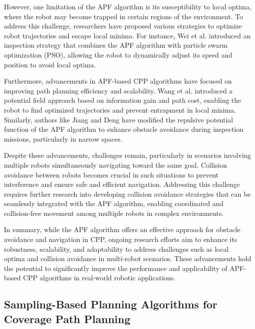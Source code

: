 \vspace*{6mm}

However, one limitation of the APF algorithm is its susceptibility to local optima, where the robot may become trapped in certain regions of the environment. To address this challenge, researchers have proposed various strategies to optimize robot trajectories and escape local minima. For instance, Wei et al. introduced an inspection strategy that combines the APF algorithm with particle swarm optimization (PSO), allowing the robot to dynamically adjust its speed and position to avoid local optima.

\vspace*{6mm}

Furthermore, advancements in APF-based CPP algorithms have focused on improving path planning efficiency and scalability. Wang et al. introduced a potential field approach based on information gain and path cost, enabling the robot to find optimized trajectories and prevent entrapment in local minima. Similarly, authors like Jiang and Deng have modified the repulsive potential function of the APF algorithm to enhance obstacle avoidance during inspection missions, particularly in narrow spaces.

\vspace*{6mm}

Despite these advancements, challenges remain, particularly in scenarios involving multiple robots simultaneously navigating toward the same goal. Collision avoidance between robots becomes crucial in such situations to prevent interference and ensure safe and efficient navigation. Addressing this challenge requires further research into developing collision avoidance strategies that can be seamlessly integrated with the APF algorithm, enabling coordinated and collision-free movement among multiple robots in complex environments.

\vspace*{6mm}

In summary, while the APF algorithm offers an effective approach for obstacle avoidance and navigation in CPP, ongoing research efforts aim to enhance its robustness, scalability, and adaptability to address challenges such as local optima and collision avoidance in multi-robot scenarios. These advancements hold the potential to significantly improve the performance and applicability of APF-based CPP algorithms in real-world robotic applications.

\subsection{Sampling-Based Planning Algorithms for Coverage Path Planning}

